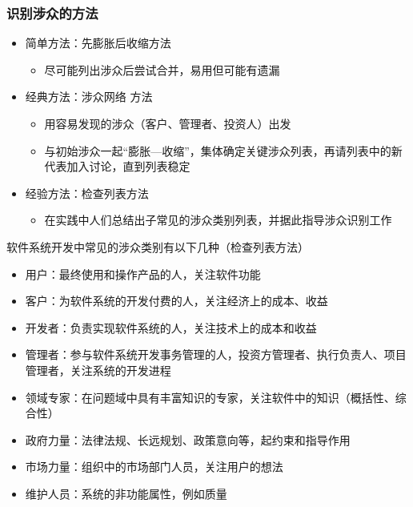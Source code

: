 \subsubsection{识别涉众的方法}
\begin{itemize}
    \item 简单方法：先膨胀后收缩方法
    \begin{itemize}
        \item 尽可能列出涉众后尝试合并，易用但可能有遗漏
    \end{itemize}
    \item 经典方法：涉众网络 方法
    \begin{itemize}
        \item 用容易发现的涉众（客户、管理者、投资人）出发
        \item 与初始涉众一起“膨胀—收缩”，集体确定关键涉众列表，再请列表中的新代表加入讨论，直到列表稳定
    \end{itemize}
    \item 经验方法：检查列表方法
    \begin{itemize}
        \item 在实践中人们总结出子常见的涉众类别列表，并据此指导涉众识别工作
    \end{itemize}
\end{itemize}

软件系统开发中常见的涉众类别有以下几种（检查列表方法）
\begin{itemize}
    \item 用户：最终使用和操作产品的人，关注软件功能 
    \item 客户：为软件系统的开发付费的人，关注经济上的成本、收益
    \item 开发者：负责实现软件系统的人，关注技术上的成本和收益
    \item 管理者：参与软件系统开发事务管理的人，投资方管理者、执行负责人、项目管理者，关注系统的开发进程
    \item 领域专家：在问题域中具有丰富知识的专家，关注软件中的知识（概括性、综合性） 
    \item 政府力量：法律法规、长远规划、政策意向等，起约束和指导作用
    \item 市场力量：组织中的市场部门人员，关注用户的想法
    \item 维护人员：系统的非功能属性，例如质量
\end{itemize}

